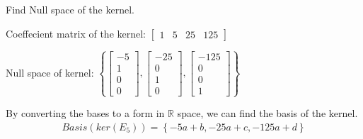 \documentclass{article}
\begin{document}
Find Null space of the kernel.

Coeffecient matrix of the kernel: $\begin{bmatrix}
1 &5 &25& 125
\end{bmatrix}$

Null space of kernel: $\left\{\begin{bmatrix}
-5\\1 \\0\\ 0
\end{bmatrix}, \begin{bmatrix}
-25\\0 \\1\\ 0
\end{bmatrix}, \begin{bmatrix}
-125\\0 \\0\\ 1
\end{bmatrix}\right\}$

By converting the bases to a form in $\mathbb{R}$ space, we can find the basis of the kernel.
\begin{align*}
    Basis(ker(E_5)) = \left\{-5a+b,-25a+c,-125a+d\right\}
\end{align*}
\end{document}
